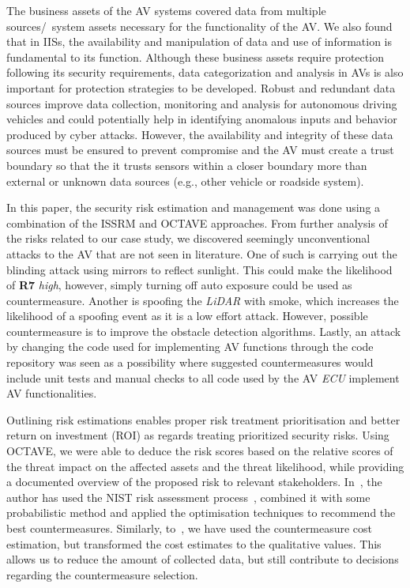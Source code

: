 \documentclass[runningheads]{llncs}
\begin{document}
The business assets of the AV systems covered data from multiple sources/~system assets necessary for the functionality of the AV. We also found that in IISs, the availability and manipulation of data and use of information is fundamental to its function. Although these business assets require protection following its security requirements, data categorization and analysis in AVs is also important for protection strategies to be developed. Robust and redundant data sources improve data collection, monitoring and analysis for autonomous driving vehicles and could potentially help in identifying anomalous inputs and behavior produced by cyber attacks. However, the availability and integrity of these data sources must be ensured to prevent compromise and the AV must create a trust boundary so that the it trusts sensors within a closer boundary more than external or unknown data sources (e.g., other vehicle or roadside system).


In this paper, the security risk estimation and management was done using a combination of the ISSRM and OCTAVE approaches.
From further analysis of the risks related to our case study, we discovered seemingly unconventional attacks to the AV that are not seen in literature. One of such is carrying out the blinding attack using mirrors to reflect sunlight. This could make the likelihood of \textbf{R7} \textit{high}, however, simply turning off auto exposure could be used as countermeasure.  Another is spoofing the \textit{LiDAR} with smoke, which increases the likelihood of a spoofing event as it is a low effort attack. However, possible countermeasure is to improve the obstacle detection algorithms. Lastly, an attack by changing the code used for implementing AV functions through the code repository was seen as a possibility where suggested countermeasures would include unit tests and manual checks to all code used by the AV \textit{ECU} implement AV functionalities.


Outlining  risk estimations enables proper risk treatment prioritisation and better return on investment (ROI) as regards treating prioritized security risks. Using OCTAVE, we were able to deduce the risk scores based on the relative scores of the threat impact on the affected assets and the threat likelihood, while providing a documented overview of the proposed risk to relevant stakeholders. 
In~\cite{Bailey2018}, the author has used the NIST risk assessment process~\cite{NIST}, combined it with some probabilistic method and applied the optimisation techniques to recommend the best countermeasures. Similarly, to~\cite{Bailey2018}, we have used the countermeasure cost estimation, but transformed the cost estimates to the qualitative values. This allows us to reduce the amount of collected data, but still contribute to decisions regarding the countermeasure selection. 
\end{document}
